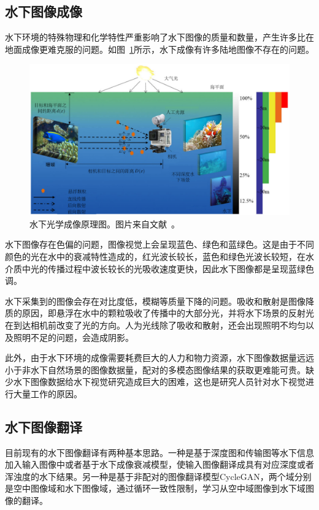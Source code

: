 \subsection{水下图像成像}
水下环境的特殊物理和化学特性严重影响了水下图像的质量和数量，产生许多比在地面成像更难克服的问题。如图~\ref{fig:underwater}所示，水下成像有许多陆地图像不存在的问题。

\begin{figure}[ht]
    \centering
	\includegraphics[width=\textwidth]{figures/水下成像.pdf}
	\caption{水下光学成像原理图。图片来自文献~\cite{2002Vision}。}
	\label{fig:underwater}
\end{figure}

水下图像存在色偏的问题，图像视觉上会呈现蓝色、绿色和蓝绿色。这是由于不同颜色的光在水中的衰减特性造成的，红光波长较长，蓝色和绿色光波长较短，在水介质中光的传播过程中波长较长的光吸收速度更快，因此水下图像都是呈现蓝绿色调。

水下采集到的图像会存在对比度低，模糊等质量下降的问题。吸收和散射是图像降质的原因，即悬浮在水中的颗粒吸收了传播中的大部分光，并将水下场景的反射光在到达相机前改变了光的方向。人为光线除了吸收和散射，还会出现照明不均匀以及照明不足的问题，会造成阴影。


此外，由于水下环境的成像需要耗费巨大的人力和物力资源，水下图像数据量远远小于非水下自然场景的图像数据量，配对的多模态图像结果的获取更难能可贵。缺少水下图像数据给水下视觉研究造成巨大的困难，这也是研究人员针对水下视觉进行大量工作的原因。

\subsection{水下图像翻译}
目前现有的水下图像翻译有两种基本思路。一种是基于深度图和传输图等水下信息加入输入图像中或者基于水下成像衰减模型，使输入图像翻译成具有对应深度或者浑浊度的水下结果。另一种是基于非配对的图像翻译模型CycleGAN，两个域分别是空中图像域和水下图像域，通过循环一致性限制，学习从空中域图像到水下域图像的翻译。

